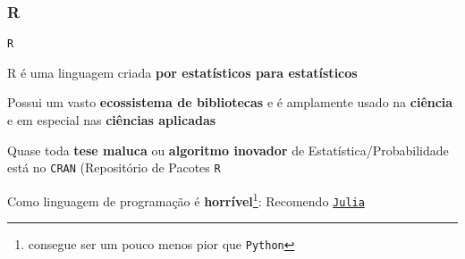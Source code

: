 
\subsubsection{R}
\begin{frame}{\texttt{R}}
    \begin{vfilleditems}
        \item R é uma linguagem criada \textbf{por estatísticos para estatísticos}
        \item Possui um vasto \textbf{ecossistema de bibliotecas} e é amplamente usado na \textbf{ciência} e em especial nas \textbf{ciências aplicadas}
        \item Quase toda \textbf{tese maluca} ou \textbf{algoritmo inovador} de Estatística/Probabilidade está no \texttt{CRAN} (Repositório de Pacotes \texttt{R}
        \item Como linguagem de programação é \textbf{horrível}\footnote{consegue ser um pouco menos pior que \texttt{Python}}: Recomendo \href{https://julialang.org/}{\texttt{Julia}}
    \end{vfilleditems}
\end{frame}

